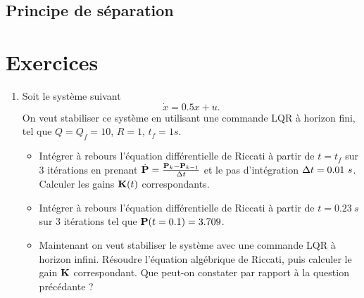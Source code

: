 \subsection{Principe de séparation}
\section{Exercices}
\begin{enumerate}
	\item Soit le système suivant 
	\begin{equation}
		\dot{x} = 0.5x + u .
	\end{equation}
	On veut stabiliser ce système en utilisant une commande LQR à horizon fini, tel que $Q=Q_f=10$, $R=1$, $t_f = 1s$.
	\begin{itemize}
		\item Intégrer à rebours l'équation différentielle de Riccati à partir de $t=t_f$ sur 3 itérations en prenant $\boldmath{\dot{\mathbf{P}}}=\frac{\mathbf{P}_{k}-\mathbf{P}_{k-1}}{\Delta t}$ et le pas d'intégration $\Delta t = 0.01~s$. Calculer les gains $\mathbf{K}(t)$ correspondants.
		\item Intégrer à rebours l'équation différentielle de Riccati à partir de $t=0.23~s$ sur 3 itérations tel que $\mathbf{P}(t=0.1)=3.709$. 
		\item Maintenant on veut stabiliser le système avec une commande LQR à horizon infini. Résoudre l'équation algébrique de Riccati, puis calculer le gain $\mathbf{K}$ correspondant. Que peut-on constater par rapport à la question précédante ?
	\end{itemize}
	

\end{enumerate}
